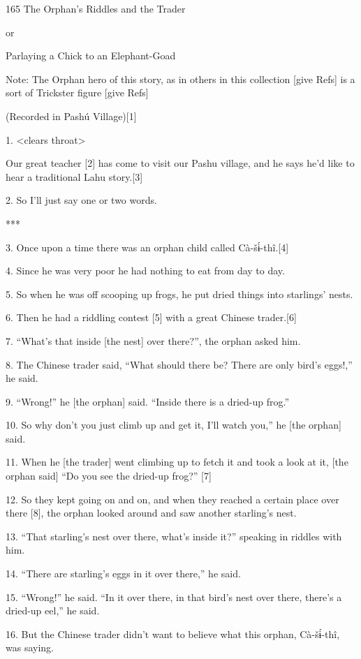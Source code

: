 
{165 The Orphan's Riddles and the Trader}

{or}

{Parlaying a Chick to an Elephant-Goad}

{Note: The Orphan hero of this story, as in others in this collection [give
Refs] is a sort of Trickster figure [give Refs]}

{(Recorded in Pashú Village)[1]}

{1. <clears throat>    }

{Our great teacher [2] has come to visit our Pashu village, and he says
he'd like to hear a traditional Lahu story.[3]}

{2. So I'll just say one or two words.}

{***}

{3. Once upon a time there was an orphan child called Cà-}{\LARGE{}šɨ́}{-thî.[4]}

{4. Since he was very poor he had nothing to eat from day to day.}

{5. So when he was off scooping up frogs, he put dried things into starlings'
nests.}

{6. Then he had a riddling contest [5] with a great Chinese trader.[6]}

{7. ``What's that inside [the nest] over there?'', the orphan asked him.}

{8. The Chinese trader said, ``What should there be? There are only bird's
eggs!,'' he said.}

{9. ``Wrong!'' he [the orphan] said. ``Inside there is a dried-up frog.''}

{10. So why don't you just climb up and get it, I'll watch you,'' he [the
orphan] said.}

{11. When he [the trader] went climbing up to fetch it and took a look at
it, [the orphan said] ``Do you see the dried-up frog?'' [7]}

{12. So they kept going on and on, and when they reached a certain place
over there [8], the orphan looked around and saw another starling's nest.}

{13. ``That starling's nest over there, what's inside it?'' speaking in
riddles with him.}

{14. ``There are starling's eggs in it over there,'' he said.}

{15. ``Wrong!'' he said. ``In it over there, in that bird's nest over there,
there's a dried-up eel,'' he said.}

{16. But the Chinese trader didn't want to believe what this orphan, Cà-}{\LARGE{}šɨ́}{-thî,
was saying.}

